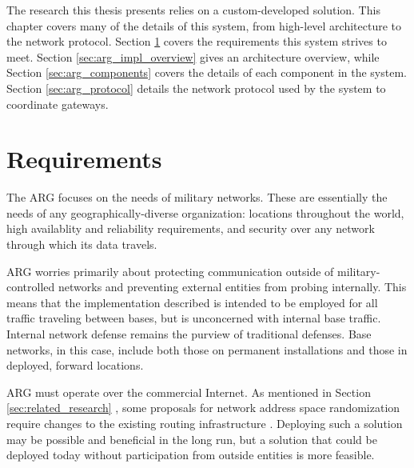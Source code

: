 \label{chp:implementation}

\par The research this thesis presents relies on a custom-developed solution. This chapter covers many of the details of this system, from high-level architecture to the network protocol. Section \ref{sec:arg_requirements} covers the requirements this system strives to meet. Section \ref{sec:arg_impl_overview} gives an architecture overview, while Section \ref{sec:arg_components} covers the details of each component in the system. Section \ref{sec:arg_protocol} details the network protocol used by the system to coordinate gateways.

\section{Requirements}
\label{sec:arg_requirements}
\par The \ac{ARG} focuses on the needs of military networks. These are essentially the needs of any geographically-diverse organization: locations throughout the world, high availablity and reliability requirements, and security over any network through which its data travels. 

\par ARG worries primarily about protecting communication outside of military-controlled networks and preventing external entities from probing internally. This means that the implementation described is intended to be employed for all traffic traveling between bases, but is unconcerned with internal base traffic. Internal network defense remains the purview of traditional defenses. Base networks, in this case, include both those on permanent installations and those in deployed, forward locations. 

\par ARG must operate over the commercial Internet. As mentioned in Section \ref{sec:related_research} , some proposals for network address space randomization require changes to the existing routing infrastructure \cite{CONTRA}. Deploying such a solution may be possible and beneficial in the long run, but a solution that could be deployed today without participation from outside entities is more feasible.



